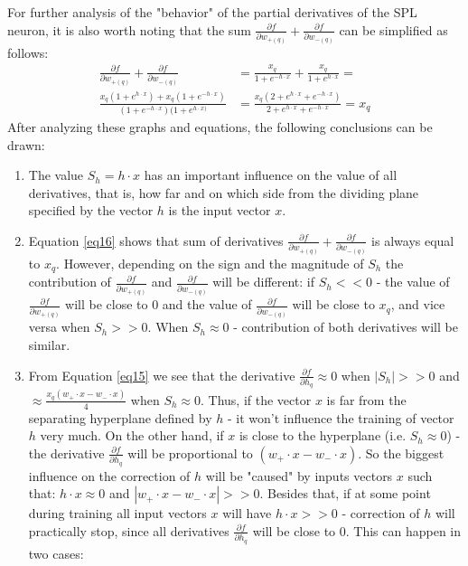 \documentclass[sn-apa]{sn-jnl}%
\begin{document}
For further analysis of the "behavior" of the partial derivatives of the SPL neuron, it is also worth noting that the sum $\frac{\partial f}{\partial w_{+(q)}} + \frac{\partial f}{\partial w_{-(q)}}$ can be simplified as follows:
\begin{align}
\frac{\partial f}{\partial w_{+(q)}} + \frac{\partial f}{\partial w_{-(q)}} &= 
	\frac{x_q}{1+e^{-h \cdot x}} + \frac{x_q}{1+e^{h \cdot x}} = \nonumber \\
\frac{x_q (1+e^{h \cdot x}) + x_q(1+e^{-h \cdot x})}{(1+e^{-h \cdot x})(1+e^{h \cdot x)}} &=
	\frac{x_q (2+e^{h \cdot x}+e^{-h \cdot x})}{2+e^{h \cdot x}+e^{-h \cdot x}} = x_q \label{eq16}
\end{align}
After analyzing these graphs and equations, the following conclusions can be drawn: 
\begin{enumerate}
\item The value $S_h=h \cdot x$ has an important influence on the value of all derivatives, that is, how far and on which side from the dividing plane specified by the vector $h$ is the input vector $x$.
\item Equation \ref{eq16} shows that sum of derivatives $\frac{\partial f}{\partial w_{+(q)}} + \frac{\partial f}{\partial w_{-(q)}}$ is always equal to $x_q$. However, depending on the sign and the magnitude of $S_h$ the contribution of $\frac{\partial f}{\partial w_{+(q)}}$ and $\frac{\partial f}{\partial w_{-(q)}}$ will be different: if $S_h << 0$ - the value of $\frac{\partial f}{\partial w_{+(q)}}$ will be close to 0 and the value of $\frac{\partial f}{\partial w_{-(q)}}$ will be close to $x_q$, and vice versa when $S_h >> 0$. When $S_h \approx 0$ - contribution of both derivatives will be similar.
\item From Equation \ref{eq15} we see that the derivative $\frac{\partial f}{\partial h_q} \approx 0 $ when $|S_h| >> 0 $ and $\approx \frac{x_q(w_+ \cdot x - w_- \cdot x)}{4}$ when $S_h \approx 0$. Thus, if the vector $x$ is far from the separating hyperplane defined by $h$ - it won't influence the training of vector $h$ very much. On the other hand, if $x$ is close to the hyperplane (i.e. $S_h \approx 0$) - the derivative $\frac{\partial f}{\partial h_q} $ will be proportional to $(w_+ \cdot x - w_- \cdot x)$. So the biggest influence on the correction of $h$ will be "caused" by inputs vectors $x$ such that: $h \cdot x \approx 0$ and $|w_+ \cdot x - w_- \cdot x| >> 0$. Besides that, if at some point during training all input vectors $x$ will have $h \cdot x >> 0$ - correction of $h$ will practically stop, since all derivatives $\frac{\partial f}{\partial h_q}$ will be close to 0. This can happen in two cases:

\end{enumerate}
\end{document}
